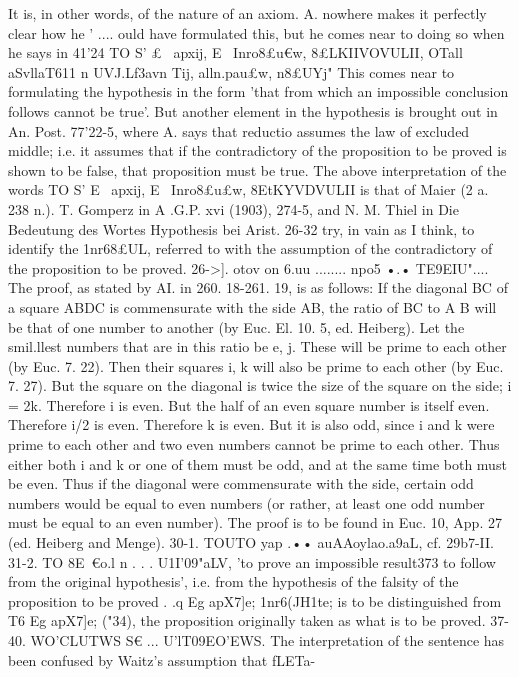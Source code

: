 {{{{{{{{{{{{It is, in other words, of the nature of an axiom. A. nowhere makes
it perfectly clear how he ' .... ould have formulated this, but he
comes near to doing so when he says in 41'24 TO S' £~ apxij, E~
Inro8£u€w, 8£LKIIVOVULII, OTall aSvllaT611 n UVJ.Lf3a{vn Tij, alln.pau£w,
n8£{UYj" This comes near to formulating the hypothesis in the
form 'that from which an impossible conclusion follows cannot
be true'. But another element in the hypothesis is brought out
in An. Post. 77'22-5, where A. says that reductio assumes the law
of excluded middle; i.e. it assumes that if the contradictory of
the proposition to be proved is shown to be false, that proposition
must be true.
The above interpretation of the words TO S' E~ apxij, E~ Inro8£u£w,
8EtKYVDVULII is that of Maier (2 a. 238 n.). T. Gomperz in A .G.P.
xvi (1903), 274-5, and N. M. Thiel in Die Bedeutung des Wortes
Hypothesis bei Arist. 26-32 try, in vain as I think, to identify
the 1nr68£UL, referred to with the assumption of the contradictory
of the proposition to be proved.
26->]. otov on 6.uu ........ npo5 •.• TE9EIU".... The proof, as stated
by AI. in 260. 18-261. 19, is as follows: If the diagonal BC of a
square ABDC is commensurate with the side AB, the ratio of
BC to A B will be that of one number to another (by Euc. El.
10. 5, ed. Heiberg). Let the smil.llest numbers that are in this
ratio be e, j. These will be prime to each other (by Euc. 7. 22).
Then their squares i, k will also be prime to each other (by
Euc. 7. 27). But the square on the diagonal is twice the size of
the square on the side; i = 2k. Therefore i is even. But the half
of an even square number is itself even. Therefore i/2 is even.
Therefore k is even. But it is also odd, since i and k were prime
to each other and two even numbers cannot be prime to each
other. Thus either both i and k or one of them must be odd, and
at the same time both must be even. Thus if the diagonal were
commensurate with the side, certain odd numbers would be equal
to even numbers (or rather, at least one odd number must be
equal to an even number). The proof is to be found in Euc. 10,
App. 27 (ed. Heiberg and Menge).
30-1. TOUTO yap .•• auAAoylao.a9aL, cf. 29b7-II.
31-2. TO 8E~€o.l n . . . U1I'09"aLV, 'to prove an impossible result373
to follow from the original hypothesis', i.e. from the hypothesis
of the falsity of the proposition to be proved . .q Eg apX7]e; 1nr6(JH1te;
is to be distinguished from T6 Eg apX7]e; ("34), the proposition
originally taken as what is to be proved.
37-40. WO'CLUTWS S€ ... U'lT09EO'EWS. The interpretation of the
sentence has been confused by Waitz's assumption that fLETa-
}}}}}}}}}}}}}}
